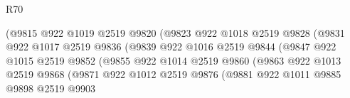 \begin{lexlean}{R70}
\begin{coremodule}
                                        (@9815
                                          @922
                                          @1019
                                          @2519
                                          @9820
                                          (@9823
                                            @922
                                            @1018
                                            @2519
                                            @9828
                                            (@9831
                                              @922
                                              @1017
                                              @2519
                                              @9836
                                              (@9839
                                                @922
                                                @1016
                                                @2519
                                                @9844
                                                (@9847
                                                  @922
                                                  @1015
                                                  @2519
                                                  @9852
                                                  (@9855
                                                    @922
                                                    @1014
                                                    @2519
                                                    @9860
                                                    (@9863
                                                      @922
                                                      @1013
                                                      @2519
                                                      @9868
                                                      (@9871
                                                        @922
                                                        @1012
                                                        @2519
                                                        @9876
                                                        (@9881
                                                          @922
                                                          @1011
                                                          @9885
                                                          @9898
                                                          @2519
                                                          @9903

\end{coremodule}
\end{lexlean}

